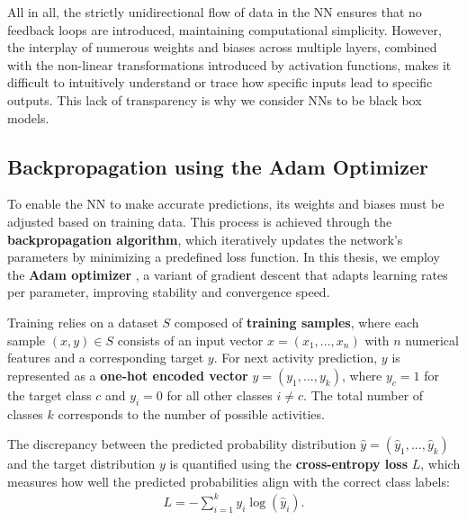 All in all, the strictly unidirectional flow of data in the NN
ensures that no feedback loops are introduced, maintaining computational simplicity.
However, the interplay of numerous weights and biases across multiple layers,
combined with the non-linear transformations introduced by activation functions,
makes it difficult to intuitively understand or trace how specific inputs lead to specific outputs.
This lack of transparency is why we consider NNs to be black box models.

\subsection{Backpropagation using the Adam Optimizer}  
\label{sec:adam}  

To enable the NN to make accurate predictions, its weights and biases must be adjusted based on training data.
This process is achieved through the \textbf{backpropagation algorithm},
which iteratively updates the network's parameters by minimizing a predefined loss function.
In this thesis, we employ the \textbf{Adam optimizer} \cite{adam},
a variant of gradient descent that adapts learning rates per parameter, improving stability and convergence speed.  

Training relies on a dataset \( S \) composed of \textbf{training samples},
where each sample \( (x, y) \in S \) consists of an input vector \( x = (x_1, ..., x_n) \) with \( n \) numerical features and a corresponding target \( y \).
For next activity prediction, \( y \) is represented as a \textbf{one-hot encoded vector} \( y = (y_1, ..., y_k) \),
where \( y_c = 1 \) for the target class \( c \) and \( y_i = 0 \) for all other classes \( i \neq c \).
The total number of classes \( k \) corresponds to the number of possible activities.  

The discrepancy between the predicted probability distribution \( \hat{y} = (\hat{y}_1, ..., \hat{y}_k) \)
and the target distribution \( y \) is quantified using the \textbf{cross-entropy loss} \( L \),
which measures how well the predicted probabilities align with the correct class labels:  
\begin{align}  
L = - \sum_{i=1}^{k} y_i \log(\hat{y}_i).  
\end{align}  

